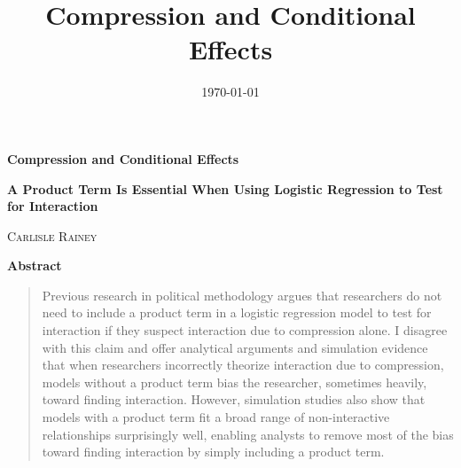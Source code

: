 \documentclass[12pt]{article}
\title{Compression and Conditional Effects}
\date{\today}
\begin{document}
\begin{center}
\LARGE{\textbf{Compression and Conditional Effects}}\\\vspace{4mm}

\normalsize{\textbf{A Product Term Is Essential When Using Logistic Regression to Test for Interaction}}\\\vspace{4mm}

\normalsize{\textsc{Carlisle Rainey}}\\\vspace{2mm}
\end{center}

\thispagestyle{empty}
{\centerline{\textbf{Abstract}}}
\begin{quote}\noindent Previous research in political methodology argues that researchers do not need to include a product term in a logistic regression model to test for interaction if they suspect interaction due to compression alone. I disagree with this claim and offer analytical arguments and simulation evidence that when researchers incorrectly theorize interaction due to compression, models without a product term bias the researcher, sometimes heavily, toward finding interaction. However, simulation studies also show that models with a product term fit a broad range of non-interactive relationships surprisingly well, enabling analysts to remove most of the bias toward finding interaction by simply including a product term.\end{quote}
\thispagestyle{empty}
\singlespace
\setcounter{page}{1}

\doublespace

\end{document}
